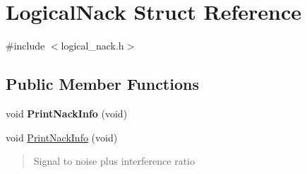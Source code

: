 \hypertarget{structLogicalNack}{}\section{Logical\+Nack Struct Reference}
\label{structLogicalNack}


{\ttfamily \#include $<$logical\+\_\+nack.\+h$>$}

\subsection*{Public Member Functions}
\begin{DoxyCompactItemize}
\item 
\mbox{\label{structLogicalNack_ada12234fce5b9a4fb0e519336c460fb5}} 
void {\bfseries Print\+Nack\+Info} (void)
\item 
void \hyperlink{structLogicalNack_ada12234fce5b9a4fb0e519336c460fb5}{Print\+Nack\+Info} (void)
\begin{DoxyCompactList}\small\item\em \begin{quote}
Signal to noise plus interference ratio \end{quote}
\end{DoxyCompactList}\end{DoxyCompactItemize}
